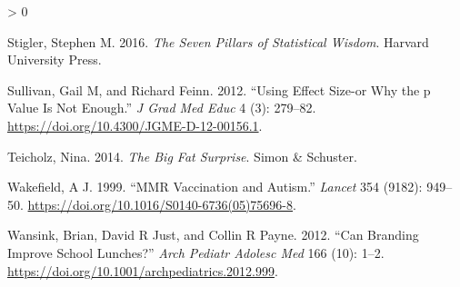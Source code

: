 \documentclass[
  12pt,
]{book}
\newlength{\cslhangindent}
\newenvironment{CSLReferences}[2] %
 {%
  \setlength{\parindent}{0pt}
  \ifodd #1 \everypar{\setlength{\hangindent}{\cslhangindent}}\ignorespaces\fi
  \ifnum #2 > 0
  \setlength{\parskip}{#2\baselineskip}
  \fi
 }%
 {}
\begin{document}
\begin{CSLReferences}{1}{0}
\leavevmode\hypertarget{ref-stig}{}%
Stigler, Stephen M. 2016. \emph{The Seven Pillars of Statistical Wisdom}. Harvard University Press.

\leavevmode\hypertarget{ref-Sullivan:2012ta}{}%
Sullivan, Gail M, and Richard Feinn. 2012. {``Using Effect Size-or Why the p Value Is Not Enough.''} \emph{J Grad Med Educ} 4 (3): 279--82. \url{https://doi.org/10.4300/JGME-D-12-00156.1}.

\leavevmode\hypertarget{ref-teic:2014}{}%
Teicholz, Nina. 2014. \emph{The Big Fat Surprise}. Simon \& Schuster.

\leavevmode\hypertarget{ref-wake:1999}{}%
Wakefield, A J. 1999. {``MMR Vaccination and Autism.''} \emph{Lancet} 354 (9182): 949--50. \url{https://doi.org/10.1016/S0140-6736(05)75696-8}.

\leavevmode\hypertarget{ref-wans:just:payn:2012}{}%
Wansink, Brian, David R Just, and Collin R Payne. 2012. {``Can Branding Improve School Lunches?''} \emph{Arch Pediatr Adolesc Med} 166 (10): 1--2. \url{https://doi.org/10.1001/archpediatrics.2012.999}.

\end{CSLReferences}
\end{document}
